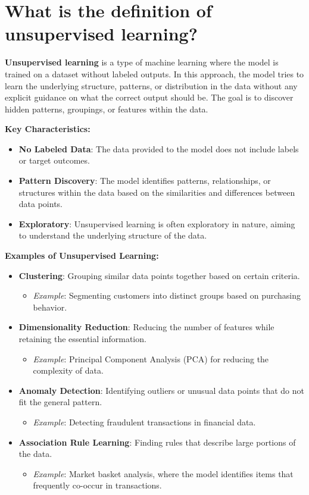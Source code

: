 \documentclass{article}
\begin{document}
\section{What is the definition of unsupervised learning?}
\textbf{Unsupervised learning} is a type of machine learning where the model is trained on a dataset without labeled outputs. In this approach, the model tries to learn the underlying structure, patterns, or distribution in the data without any explicit guidance on what the correct output should be. The goal is to discover hidden patterns, groupings, or features within the data.

\textbf{Key Characteristics:}
\begin{itemize}
    \item \textbf{No Labeled Data}: The data provided to the model does not include labels or target outcomes.
    \item \textbf{Pattern Discovery}: The model identifies patterns, relationships, or structures within the data based on the similarities and differences between data points.
    \item \textbf{Exploratory}: Unsupervised learning is often exploratory in nature, aiming to understand the underlying structure of the data.
\end{itemize}

\textbf{Examples of Unsupervised Learning:}
\begin{itemize}
    \item \textbf{Clustering}: Grouping similar data points together based on certain criteria.
    \begin{itemize}
        \item \textit{Example}: Segmenting customers into distinct groups based on purchasing behavior.
    \end{itemize}
    \item \textbf{Dimensionality Reduction}: Reducing the number of features while retaining the essential information.
    \begin{itemize}
        \item \textit{Example}: Principal Component Analysis (PCA) for reducing the complexity of data.
    \end{itemize}
    \item \textbf{Anomaly Detection}: Identifying outliers or unusual data points that do not fit the general pattern.
    \begin{itemize}
        \item \textit{Example}: Detecting fraudulent transactions in financial data.
    \end{itemize}
    \item \textbf{Association Rule Learning}: Finding rules that describe large portions of the data.
    \begin{itemize}
        \item \textit{Example}: Market basket analysis, where the model identifies items that frequently co-occur in transactions.
    \end{itemize}
\end{itemize}
\end{document}

